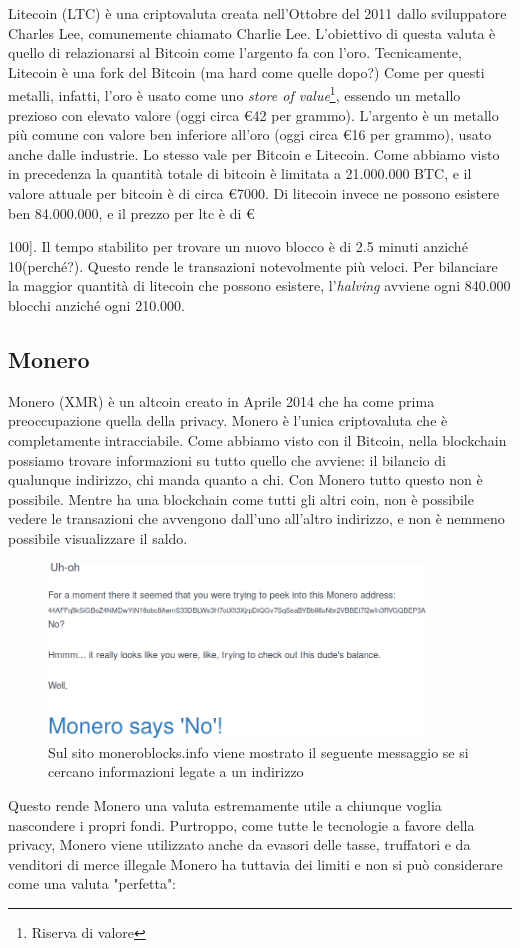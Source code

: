 \documentclass {article}
\begin{document}
Litecoin (LTC) è una criptovaluta creata nell'Ottobre del 2011 dallo sviluppatore Charles Lee, comunemente chiamato Charlie Lee. L'obiettivo di questa valuta è quello di relazionarsi al Bitcoin come l'argento fa con l'oro.
Tecnicamente, Litecoin è una fork del Bitcoin (ma hard come quelle dopo?)
Come per questi metalli, infatti, l'oro è usato come uno \textit{store of value}\footnote{Riserva di valore}, essendo un metallo prezioso con elevato valore (oggi circa \euro{42} per grammo). L'argento è un metallo più comune con valore ben inferiore all'oro (oggi circa \euro{16} per grammo), usato anche dalle industrie.
Lo stesso vale per Bitcoin e Litecoin. Come abbiamo visto in precedenza la quantità totale di bitcoin è limitata a 21.000.000 BTC, e il valore attuale per bitcoin è di circa \euro{7000}. Di litecoin invece ne possono esistere ben 84.000.000, e il prezzo per ltc è di \euro{100].
Il tempo stabilito per trovare un nuovo blocco è di 2.5 minuti anziché 10(perché?). Questo rende le transazioni notevolmente più veloci.
Per bilanciare la maggior quantità di litecoin che possono esistere, l'\textit{halving} avviene ogni 840.000 blocchi anziché ogni 210.000.


\subsection {Monero}


Monero (XMR) è un altcoin creato in Aprile 2014 che ha come prima preoccupazione quella della privacy.
Monero è l'unica criptovaluta che è completamente intracciabile. Come abbiamo visto con il Bitcoin, nella blockchain possiamo trovare informazioni su tutto quello che avviene: il bilancio di qualunque indirizzo, chi manda quanto a chi.
Con Monero tutto questo non è possibile. Mentre ha una blockchain come tutti gli altri coin, non è possibile vedere le transazioni che avvengono dall'uno all'altro indirizzo, e non è nemmeno possibile visualizzare il saldo.

\vspace {0.5cm}
\begin{figure}[h]
\includegraphics [width = 10cm] {monero.png}
\centering
\caption {Sul sito moneroblocks.info viene mostrato il seguente messaggio se si cercano informazioni legate a un indirizzo}
\end{figure}
\vspace {0.2cm}
\noindent
%
Questo rende Monero una valuta estremamente utile a chiunque voglia nascondere i propri fondi.
Purtroppo, come tutte le tecnologie a favore della privacy, Monero viene utilizzato anche da evasori delle tasse, truffatori e da venditori di merce illegale
Monero ha tuttavia dei limiti e non si può considerare come una valuta "perfetta": 

}
\end{document}
